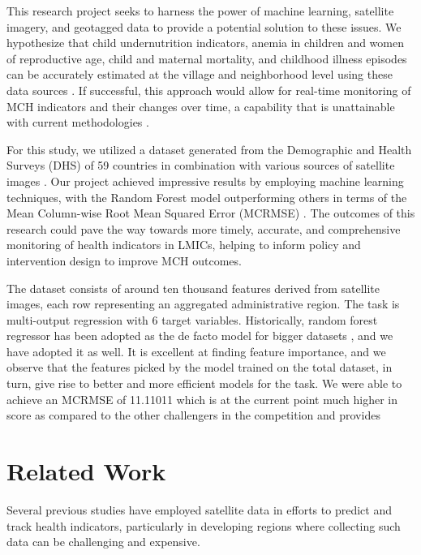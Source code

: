 \documentclass{article}
\begin{document}
This research project seeks to harness the power of machine learning, satellite imagery, and geotagged data to provide a potential solution to these issues. We hypothesize that child undernutrition indicators, anemia in children and women of reproductive age, child and maternal mortality, and childhood illness episodes can be accurately estimated at the village and neighborhood level using these data sources \cite{Jean2016}. If successful, this approach would allow for real-time monitoring of MCH indicators and their changes over time, a capability that is unattainable with current methodologies \cite{Bhattacharjee2021}.

For this study, we utilized a dataset generated from the Demographic and Health Surveys (DHS) of 59 countries in combination with various sources of satellite images \cite{DHSprogram}. Our project achieved impressive results by employing machine learning techniques, with the Random Forest model outperforming others in terms of the Mean Column-wise Root Mean Squared Error (MCRMSE) \cite{Wolpert2001}. The outcomes of this research could pave the way towards more timely, accurate, and comprehensive monitoring of health indicators in LMICs, helping to inform policy and intervention design to improve MCH outcomes.

The dataset consists of around ten thousand features derived from satellite images, each row representing an aggregated administrative region. The task is multi-output regression with 6 target variables.  Historically, random forest regressor has been adopted as the de facto model for bigger datasets \cite{rf_large_data}, and we have adopted it as well. It is excellent at finding feature importance, and we observe that the features picked by the model trained on the total dataset, in turn, give rise to better and more efficient models for the task. We were able to achieve an MCRMSE of 11.11011 which is at the current point much higher in score as compared to the other challengers in the competition and provides 

\section{Related Work}

Several previous studies have employed satellite data in efforts to predict and track health indicators, particularly in developing regions where collecting such data can be challenging and expensive.
\end{document}
